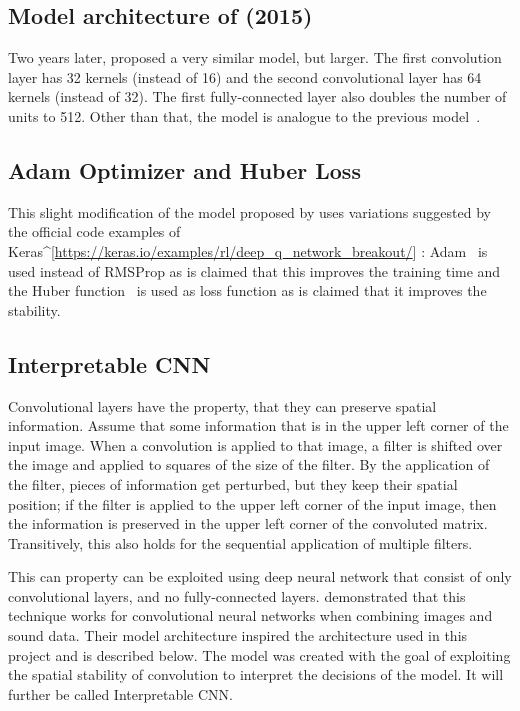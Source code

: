 \subsection{Model architecture of \textcite{mnih_human-level_2015} (2015)}

Two years later, \textcite{mnih_human-level_2015} proposed a very similar model, but larger. The first convolution layer has 32 kernels (instead of 16) and the second convolutional layer has 64 kernels (instead of 32). The first fully-connected layer also doubles the number of units to 512. Other than that, the model is analogue to the previous model~\parencite{mnih_playing_2013,mnih_human-level_2015}.

\subsection{Adam Optimizer and Huber Loss}

This slight modification of the model proposed by \textcite{mnih_human-level_2015} uses variations suggested by the official code examples of Keras\textasciicircum{}[\url{https://keras.io/examples/rl/deep_q_network_breakout/}] : Adam~\parencite{kingma_adam_2017} is used instead of RMSProp as is claimed that this improves the training time and the Huber function~\parencite{huber_robust_1964} is used as loss function as is claimed that it improves the stability.

\subsection{Interpretable CNN}

Convolutional layers have the property, that they can preserve spatial information. Assume that some information that is in the upper left corner of the input image. When a convolution is applied to that image, a filter is shifted over the image and applied to squares of the size of the filter. By the application of the filter, pieces of information get perturbed, but they keep their spatial position; if the filter is  applied to the upper left corner of the input image, then the information is preserved in the upper left corner of the convoluted matrix. Transitively, this also holds for the sequential application of multiple filters.

This can property can be exploited using deep neural network that consist of only convolutional layers, and no fully-connected layers. \textcite{arandjelovic_objects_2018} demonstrated that this technique works for convolutional neural networks when combining images and sound data. Their model architecture inspired the architecture used in this project and is described below. The model was created with the goal of exploiting the spatial stability of convolution to interpret the decisions of the model. It will further be called Interpretable CNN.

